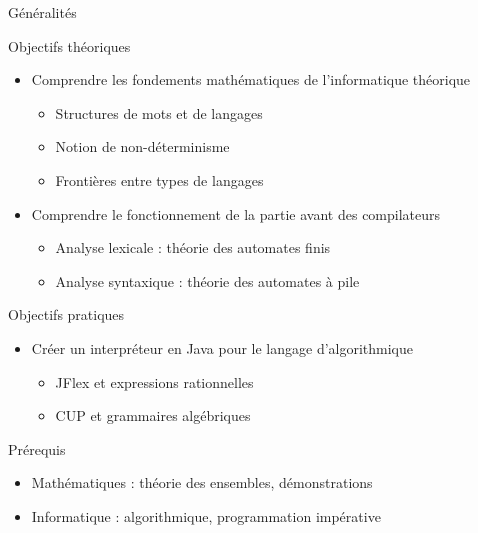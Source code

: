 
\begingroup

\begin{frame}{Généralités}

  \begin{block}{Objectifs théoriques}
    \begin{itemize}
    \item Comprendre les fondements mathématiques de l'informatique théorique
      \begin{itemize}
      \item Structures de mots et de langages
      \item Notion de non-déterminisme
      \item Frontières entre types de langages
      \end{itemize}
    \item Comprendre le fonctionnement de la partie avant des compilateurs
      \begin{itemize}
      \item Analyse lexicale : théorie des automates finis
      \item Analyse syntaxique : théorie des automates à pile 
      \end{itemize}
    \end{itemize}
  \end{block}

  \begin{block}{Objectifs pratiques}
    \begin{itemize}
    \item Créer un interpréteur en Java pour le langage d'algorithmique 
      \begin{itemize}
      \item JFlex et expressions rationnelles
      \item CUP et grammaires algébriques
      \end{itemize}
    \end{itemize}
  \end{block}
  
  \begin{block}{Prérequis}
    \begin{itemize}
    \item Mathématiques : théorie des ensembles, démonstrations
    \item Informatique : algorithmique, programmation impérative 
    \end{itemize}
  \end{block}
\end{frame}

\endgroup

